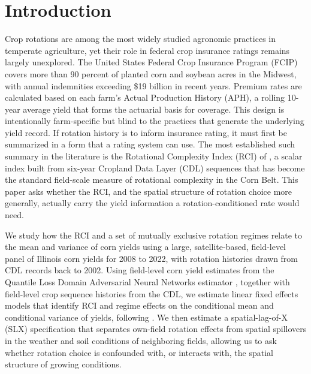 \documentclass[12pt,letterpaper]{article}
\theoremstyle{remark}
\theoremstyle{remark}
\theoremstyle{plain}
\theoremstyle{definition}
\begin{document}
\newpage
\setcounter{page}{1}

\section{\label{sec:intro}Introduction}

Crop rotations are among the most widely studied agronomic practices in temperate agriculture, yet their role in federal crop insurance ratings remains largely unexplored. The United States Federal Crop Insurance Program (FCIP) covers more than 90 percent of planted corn and soybean acres in the Midwest, with annual indemnities exceeding \$19 billion in recent years. Premium rates are calculated based on each farm's Actual Production History (APH), a rolling 10-year average yield that forms the actuarial basis for coverage. This design is intentionally farm-specific but blind to the practices that generate the underlying yield record. If rotation history is to inform insurance rating, it must first be summarized in a form that a rating system can use. The most established such summary in the literature is the Rotational Complexity Index (RCI) of \citet{socolar2021}, a scalar index built from six-year Cropland Data Layer (CDL) sequences that has become the standard field-scale measure of rotational complexity in the Corn Belt. This paper asks whether the RCI, and the spatial structure of rotation choice more generally, actually carry the yield information a rotation-conditioned rate would need.

We study how the RCI and a set of mutually exclusive rotation regimes relate to the mean and variance of corn yields using a large, satellite-based, field-level panel of Illinois corn yields for 2008 to 2022, with rotation histories drawn from CDL records back to 2002. Using field-level corn yield estimates from the Quantile Loss Domain Adversarial Neural Networks estimator \citep[QDANN;][]{Ma2024}, together with field-level crop sequence histories from the CDL, we estimate linear fixed effects models that identify RCI and regime effects on the conditional mean and conditional variance of yields, following \citet{Just1979}. We then estimate a spatial-lag-of-X (SLX) specification that separates own-field rotation effects from spatial spillovers in the weather and soil conditions of neighboring fields, allowing us to ask whether rotation choice is confounded with, or interacts with, the spatial structure of growing conditions.
\end{document}
